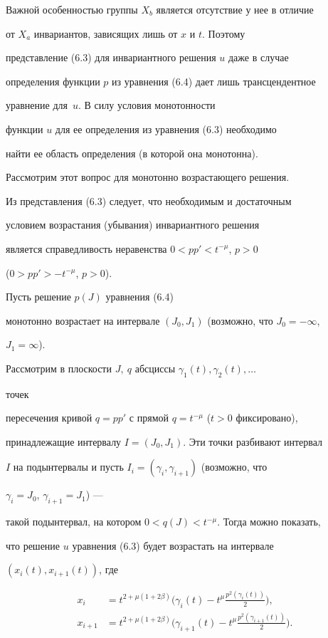 Важной особенностью группы $X_b$ является отсутствие у нее в отличие  


от $X_a$ инвариантов, зависящих лишь от $x$ и $t$. Поэтому 


представление (6.3) для инвариантного решения $u$ даже в случае  


определения функции $p$ из уравнения (6.4) дает лишь трансцендентное  


уравнение для~$u$. В силу условия монотонности  


функции $u$ для ее определения из уравнения (6.3) необходимо  


найти ее область определения (в которой она монотонна).  


Рассмотрим этот вопрос для монотонно возрастающего решения.  


Из представления (6.3) следует, что необходимым и достаточным  


условием возрастания (убывания) инвариантного решения 


является справедливость неравенства $0<pp'<t^{-\mu}$, $p>0$ 


($0>pp'>-t^{-\mu}$, $p>0$). 


Пусть решение $p(J)$ уравнения (6.4) 


монотонно возрастает на интервале $(J_0,J_1)$ (возможно, что $J_0=-\infty$, 


$J_1=\infty$). 


Рассмотрим в плоскости $J,\ q$ абсциссы $\gamma_1(t),\gamma_2(t),\dotsc$ 


точек  


пересечения кривой $q=pp'$ с прямой $q=t^{-\mu}$ ($t>0$ фиксировано),  


принадлежащие интервалу $I=(J_0,J_1)$. Эти точки разбивают интервал 


$I$ на подынтервалы и пусть $I_i=(\gamma_i,\gamma_{i+1})$ (возможно, что 


$\gamma_i=J_0$, $\gamma_{i+1}=J_1$) --- 


такой подынтервал, на котором $0<q(J)<t^{-\mu}$. Тогда можно показать, 


что решение $u$ уравнения (6.3) будет возрастать на интервале 


$(x_i(t),x_{i+1}(t))$, где 


\begin{equation} 


\begin{split} 


x_i&=t^{2+\mu(1+2\beta)}\bigg(\gamma_i(t)-t^\mu 


\frac{p^2(\gamma_i(t))}{2}\bigg),\\ 


x_{i+1}&=t^{2+\mu(1+2\beta)}\bigg(\gamma_{i+1}(t)-t^\mu 


\frac{p^2(\gamma_{i+1}(t))}{2}\bigg). 


\end{split} 


\end{equation} 


